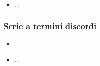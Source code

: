 \documentclass[letterpaper,10pt,italian]{jupyterBook}
\begin{document}
\sphinxAtStartPar
{}
\begin{itemize}
\item {} 
\sphinxAtStartPar
…

\end{itemize}

\sphinxAtStartPar
{}


\subsubsection{Serie a termini discordi}
\label{\detokenize{ch/series/series-numerical-real:serie-a-termini-discordi}}\begin{itemize}
\item {} 
\sphinxAtStartPar
{}

\item {} 
\sphinxAtStartPar
…

\end{itemize}
\end{document}
